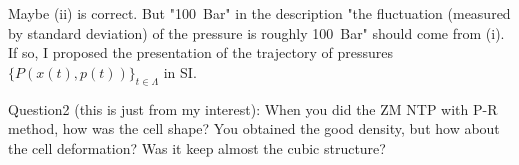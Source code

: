 \documentclass[a4paper,preprint,unsortedaddress,onecolumn,fleqn]{revtex4}
\begin{document}
{\color{blue}Maybe (ii) is correct. But "100~Bar" in the description "the
fluctuation (measured by standard deviation) of the pressure is roughly
100~Bar" should come from (i). If so, I proposed the presentation of the
trajectory of pressures $\{P(x(t),p(t))\}_{t\in \Lambda }$ in SI.}

{\color{blue}Question2 (this is just from my interest): When you did the ZM
NTP with P-R method, how was the cell shape? You obtained the good density,
but how about the cell deformation? Was it keep almost the cubic structure?}

% 


{}
\end{document}
